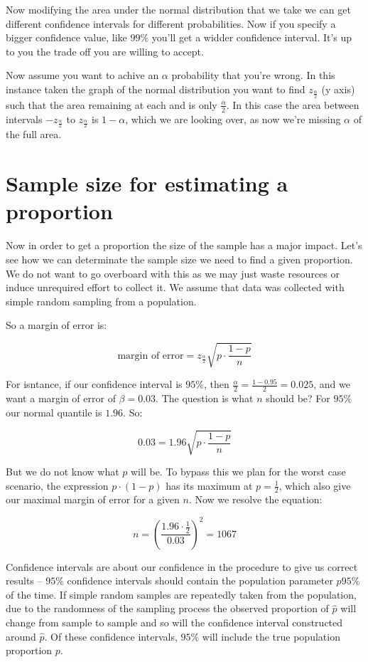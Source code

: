 Now modifying the area under the normal distribution that we take we can get
different confidence intervals for different probabilities. Now if you specify a
bigger confidence value, like $99\%$ you'll get a widder confidence interval.
It's up to you the trade off you are willing to accept.

Now assume you want to achive an $\alpha$ probability that you're wrong. In
this instance taken the graph of the normal distribution you want to find
$z_{\frac{\alpha}{2}}$ (y axis) such that the area remaining at each and is only
$\frac{\alpha}{2}$. In this case the area between intervals
$-z_{\frac{\alpha}{2}}$ to $z_{\frac{\alpha}{2}}$ is $1-\alpha$, which we are
looking over, as now we're missing $\alpha$ of the full area.

\section{Sample size for estimating a proportion}

Now in order to get a proportion the size of the sample has a major impact.
Let's see how we can determinate the sample size we need to find a given
proportion. We do not want to go overboard with this as we may just waste
resources or induce unrequired effort to collect it. We assume that data was
collected with simple random sampling from a population.

So a margin of error is:

\[ \mbox{margin of error} = z_{\frac{\alpha}{2}}\sqrt{p \cdot
\frac{1-p}{n}}\]

For isntance, if our confidence interval is $95\%$, then
$\frac{\alpha}{2}=\frac{1-0.95}{2}=0.025$, and we want a margin of error of
$\beta=0.03$. The question is what $n$ should be? For $95\%$ our normal quantile
is $1.96$. So:

\[ 0.03 = 1.96\sqrt{p \cdot
\frac{1-p}{n}}\]

 But we do not know what $p$ will be. To bypass this we plan for the worst case
 scenario, the expression $p\cdot(1-p)$ has its maximum at $p=\frac{1}{2}$,
 which also give our maximal margin of error for a given $n$. Now we resolve the
 equation:

 \[ n=\left( \frac{1.96 \cdot \frac{1}{2}}{0.03} \right)^2 = 1067 \]

Confidence intervals are about our confidence in the procedure to give us
correct results -- $95\%$ confidence intervals should contain the population
parameter $p 95\%$ of the time. If simple random samples are repeatedly taken
from the population, due to the randomness of the sampling process the observed
proportion of $\hat{p}$ will change from sample to sample and so will the
confidence interval constructed around $\hat{p}$. Of these confidence intervals,
$95\%$ will include the true population proportion $p$.

